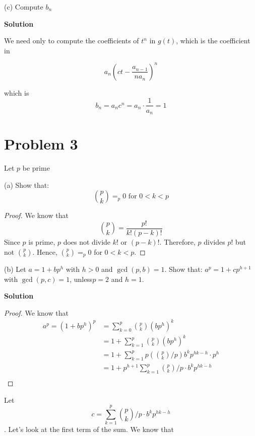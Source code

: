 \documentclass{article}
\newcommand{\solution}{\textbf{\large Solution}}
\begin{document}
(c) Compute $b_n$

\solution

We need only to compute the coefficients of $t^{n}$ in $g(t)$, which is the coefficient in

\begin{equation}
    a_n\left(ct-\frac{a_{n-1}}{na_n}\right)^n
\end{equation}

which is
\begin{equation}
    b_n=a_nc^n = a_n \cdot \frac{1}{a_n} = 1
\end{equation}

\section{Problem 3}

Let $p$ be prime 

(a) Show that: 
\begin{equation*}
    \binom{p}{k} =_p 0 \text{ for } 0 < k < p
\end{equation*}

\begin{proof}
    We know that 
    \begin{equation*}
        \binom{p}{k} = \frac{p!}{k!(p-k)!}
    \end{equation*}
    Since $p$ is prime, $p$ does not divide $k!$ or $(p-k)!$. Therefore, $p$ divides $p!$ but not $\binom{p}{k}$. Hence, $\binom{p}{k} =_p 0$ for $0 < k < p$.
\end{proof}

(b) Let    $ a=1 + bp^h$      with $h > 0$ and $\gcd(p, b)  =  1$.       Show that:   
$a^p   =   1 + cp^{h+1}$     with   $\gcd(p, c)  =  1$,    unless$ p = 2$ and $h = 1$.

\solution

\begin{proof}
    We know that 
    \begin{align*}
        a^p = (1 + bp^h)^p &= \sum_{k=0}^p \binom{p}{k} (bp^h)^k\\ 
        &= 1 + \sum_{k=1}^{p} \binom{p}{k} (bp^h)^k\\
        &= 1 + \sum_{k=1}^{p} p\left(\binom{p}{k} \Big/ p\right)b^kp^{hk-h}\cdot p^h\\
        &= 1 + p^{h+1}\sum_{k=1}^{p} \binom{p}{k} \Big/ p\cdot b^kp^{hk-h}\\
    \end{align*}
\end{proof}
Let \[c = \sum_{k=1}^{p} \binom{p}{k} \Big/ p\cdot b^kp^{hk-h}\]. Let's look at the first term of the sum. We know that
\end{document}
